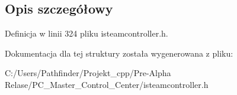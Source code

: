 \subsection{Opis szczegółowy}


Definicja w linii 324 pliku isteamcontroller.\+h.



Dokumentacja dla tej struktury została wygenerowana z pliku\+:\begin{DoxyCompactItemize}
\item 
C\+:/\+Users/\+Pathfinder/\+Projekt\+\_\+cpp/\+Pre-\/\+Alpha Relase/\+P\+C\+\_\+\+Master\+\_\+\+Control\+\_\+\+Center/isteamcontroller.\+h\end{DoxyCompactItemize}
